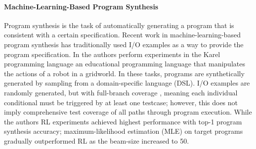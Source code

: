 \documentclass{article}
\begin{document}





\paragraph{Machine-Learning-Based Program Synthesis} Program synthesis is the task of automatically generating a program that is consistent with a certain specification. Recent work in machine-learning-based program synthesis has traditionally used I/O examples as a way to provide the program specification. In \cite{bunel2018leveraging} the authors perform experiments in the Karel programming language \cite{pattis1981karel} an educational programming language that manipulates the actions of a robot in a gridworld.
In these tasks, programs are synthetically generated by sampling from a domain-specific language (DSL). I/O examples are randomly generated, but with full-branch coverage , meaning each individual conditional must be triggered by at least one  testcase; however, this does not imply comprehensive test coverage of all paths through program execution. While the authors RL experiments achieved highest performance with top-1 program synthesis accuracy; maximum-likelihood estimation (MLE) on target programs gradually outperformed RL as the beam-size increased to 50. 
\end{document}
